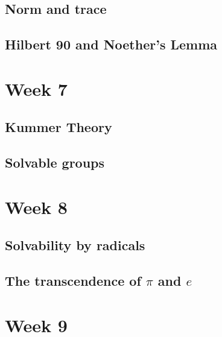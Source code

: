\documentclass[12pt]{report}
\theoremstyle{definition}
\def\ZZ{\mathbb{Z}}
\def\aa{\alpha}
\def\Gal{\text{Gal}}
\def\char{\text{char}}
\begin{document}


\section{Norm and trace}

\section{Hilbert 90 and Noether's Lemma}


\chapter*{Week 7}
\setcounter{chapter}{7}

\section{Kummer Theory}

\section{Solvable groups}

\chapter*{Week 8}
\setcounter{chapter}{8}

\section{Solvability by radicals}

\section{The transcendence of $\pi$ and $e$}

\chapter*{Week 9}
\setcounter{chapter}{9}
\end{document}
